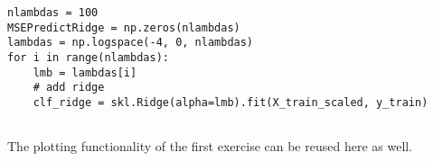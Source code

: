 \documentclass[%
oneside,                 %
final,                   %
10pt]{article}
\newenvironment{doconceexercise}{}{}
\begin{document}
\begin{doconceexercise}
\begin{verbatim}
nlambdas = 100
MSEPredictRidge = np.zeros(nlambdas)
lambdas = np.logspace(-4, 0, nlambdas)
for i in range(nlambdas):
    lmb = lambdas[i]
    # add ridge
    clf_ridge = skl.Ridge(alpha=lmb).fit(X_train_scaled, y_train)


\end{verbatim}

The plotting functionality of the first exercise can be reused here as well.


\end{doconceexercise}


\end{document}
